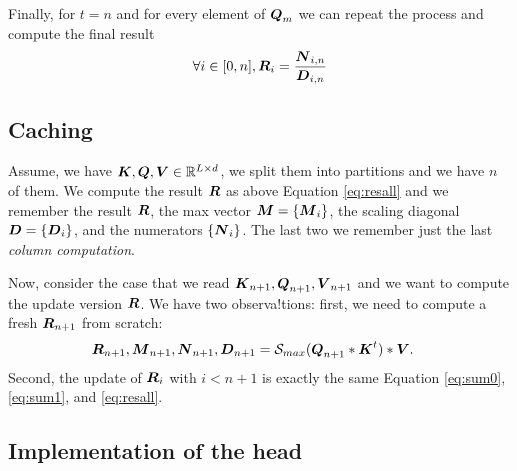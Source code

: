 \documentclass[journal]{IEEEtran}
\begin{document}
Finally, for $t=n$ and for every element of ${\boldsymbol Q}_m$ we can repeat
the process and compute the final result
\begin{equation}
  \label{eq:resall}
 \forall i \in [0,n],\/ \Vc{R}_i = \frac{\Vc{N}_{i,n}}{\Vc{D}_{i,n}}
\end{equation}
\begin{comment}
Each $\Vc{R}_i$ are independent.  Space requirements: $\Vc{Q}_i,
\Vc{K}_i, \Vc{V}_i \in \R^{d \times d}$,, $\Vc{Q}_i\Vc{K}_j \in
\R^{d\times d}$, $\exp\Vc{Q}_i\Vc{K}_j \in \R^{d\times d}$
$\Vc{D}_{0,i} \in \R^{d}$, $\Vc{N}_{0,t}\Vc{N}_{0,t+1} \in \R^{d
  \times d}$.

We need to keep in memory $\Vc{D}_{0,t}$ and $\Vc{N}_{0,t}$, we
compute $\exp{\Vc{Q}_0\Vc{K}_{t+1}}$ to add to $\Vc{D}_{0,t}$, we then
compute $(\exp{\Vc{Q}_0\Vc{K}_{t+1}})\Vc{V}_{t+1}$. We need 5 matrices
of size $d \times d$. We store $\Vc{D}_{0,t+1}$ and $\Vc{N}_{0,t+1}$.
\end{comment}

\subsection{Caching}
Assume, we have ${\boldsymbol K},{\boldsymbol Q},{\boldsymbol V} \in \mathbb{R} ^{L\times d}$, we split
them into partitions and we have $n$ of them.  We compute the result
${\boldsymbol R}$ as above Equation \ref{eq:resall} and we remember the result
${\boldsymbol R}$, the max vector ${\boldsymbol M} = \{{\boldsymbol M}_i\}$, the scaling diagonal
$ {\boldsymbol D} = \{ {\boldsymbol D}_{i} \}$, and the numerators
$\{{\boldsymbol N}_{i}\}$. The last two we remember just the last {\em column
  computation}.

Now, consider the case that we read
${\boldsymbol K}_{n+1},{\boldsymbol Q}_{n+1},{\boldsymbol V}_{n+1}$ and we want to compute the
update version ${\boldsymbol R}$. We have two observa!tions: first, we need to
compute a fresh ${\boldsymbol R}_{n+1}$ from scratch:
\begin{align}
  \Vc{R}_{n+1},\Vc{M}_{n+1},\Vc{N}_{n+1}, \Vc{D}_{n+1} &= \Smax{\Vc{Q}_{n+1}*\Vc{K}^t}*\Vc{V}.
\end{align}
Second, the update of ${\boldsymbol R}_i$ with $i<n+1$ is exactly the same
Equation \ref{eq:sum0}, \ref{eq:sum1}, and \ref{eq:resall}.












\subsection{Implementation of the head}
\end{document}
